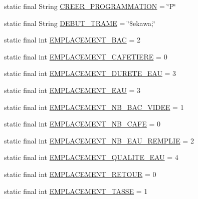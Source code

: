 \begin{DoxyCompactItemize}
\item 
static final String \hyperlink{classcom_1_1example_1_1ekawa_1_1_protocole_a2ca55536aa2d416dbc4bf7856c6bae3c}{C\+R\+E\+E\+R\+\_\+\+P\+R\+O\+G\+R\+A\+M\+M\+A\+T\+I\+ON} = \char`\"{}P\char`\"{}
\item 
static final String \hyperlink{classcom_1_1example_1_1ekawa_1_1_protocole_a9a73b15a5d0408ae423cc6f4ff3e7c21}{D\+E\+B\+U\+T\+\_\+\+T\+R\+A\+ME} = \char`\"{}\$ekawa;\char`\"{}
\item 
static final int \hyperlink{classcom_1_1example_1_1ekawa_1_1_protocole_ab60999720fc62237ae5f8c1e7921aa4d}{E\+M\+P\+L\+A\+C\+E\+M\+E\+N\+T\+\_\+\+B\+AC} = 2
\item 
static final int \hyperlink{classcom_1_1example_1_1ekawa_1_1_protocole_af6d747772dbddcd7e7b76745174645f0}{E\+M\+P\+L\+A\+C\+E\+M\+E\+N\+T\+\_\+\+C\+A\+F\+E\+T\+I\+E\+RE} = 0
\item 
static final int \hyperlink{classcom_1_1example_1_1ekawa_1_1_protocole_a9345f9120d147cf525afc440f4746129}{E\+M\+P\+L\+A\+C\+E\+M\+E\+N\+T\+\_\+\+D\+U\+R\+E\+T\+E\+\_\+\+E\+AU} = 3
\item 
static final int \hyperlink{classcom_1_1example_1_1ekawa_1_1_protocole_a2a6093ce136870c13b2ace7e46be9a5f}{E\+M\+P\+L\+A\+C\+E\+M\+E\+N\+T\+\_\+\+E\+AU} = 3
\item 
static final int \hyperlink{classcom_1_1example_1_1ekawa_1_1_protocole_ac637e46d16d675adb3c0729055d259cd}{E\+M\+P\+L\+A\+C\+E\+M\+E\+N\+T\+\_\+\+N\+B\+\_\+\+B\+A\+C\+\_\+\+V\+I\+D\+EE} = 1
\item 
static final int \hyperlink{classcom_1_1example_1_1ekawa_1_1_protocole_a328dc7d5ae0030abea78746a469d0301}{E\+M\+P\+L\+A\+C\+E\+M\+E\+N\+T\+\_\+\+N\+B\+\_\+\+C\+A\+FE} = 0
\item 
static final int \hyperlink{classcom_1_1example_1_1ekawa_1_1_protocole_a3c7e43fc0589bd18f2e4631c509cbb59}{E\+M\+P\+L\+A\+C\+E\+M\+E\+N\+T\+\_\+\+N\+B\+\_\+\+E\+A\+U\+\_\+\+R\+E\+M\+P\+L\+IE} = 2
\item 
static final int \hyperlink{classcom_1_1example_1_1ekawa_1_1_protocole_aeb21f04096c5f1220c172bfdfbdd5dae}{E\+M\+P\+L\+A\+C\+E\+M\+E\+N\+T\+\_\+\+Q\+U\+A\+L\+I\+T\+E\+\_\+\+E\+AU} = 4
\item 
static final int \hyperlink{classcom_1_1example_1_1ekawa_1_1_protocole_a4e694989f44fe628753f5e65f6c8c08e}{E\+M\+P\+L\+A\+C\+E\+M\+E\+N\+T\+\_\+\+R\+E\+T\+O\+UR} = 0
\item 
static final int \hyperlink{classcom_1_1example_1_1ekawa_1_1_protocole_a2ca3da411b9d68caf3ac2ff0cdf55216}{E\+M\+P\+L\+A\+C\+E\+M\+E\+N\+T\+\_\+\+T\+A\+S\+SE} = 1

\end{DoxyCompactItemize}
